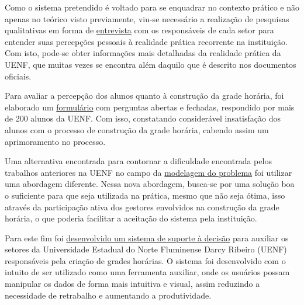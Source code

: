 
Como o sistema pretendido é voltado para se enquadrar no contexto prático e não apenas no teórico visto previamente, viu-se necessário a realização de pesquisas qualitativas em forma de \hyperref[sec:entrevistas]{entrevista} com os responsáveis de cada setor para entender suas percepções pessoais à realidade prática recorrente na instituição. Com isto, pode-se obter informações mais detalhadas da realidade prática da UENF, que muitas vezes se encontra além daquilo que é descrito nos documentos oficiais.


Para avaliar a percepção dos alunos quanto à construção da grade horária, foi elaborado um \hyperref[sec:formulario]{formulário} com perguntas abertas e fechadas, respondido por mais de 200 alunos da UENF. Com isso, constatando considerável insatisfação dos alunos com o processo de construção da grade horária, cabendo assim um aprimoramento no processo.


Uma alternativa encontrada para contornar a dificuldade encontrada pelos trabalhos anteriores na UENF no campo da \hyperref[chap:modelagem]{modelagem do problema} foi utilizar uma abordagem diferente. Nessa nova abordagem, busca-se por uma solução boa o suficiente para que seja utilizada na prática, mesmo que não seja ótima, isso através da participação ativa dos gestores envolvidos na construção da grade horária, o que poderia facilitar a aceitação do sistema pela instituição.


Para este fim foi \hyperref[chap:desenvolvimento]{desenvolvido um sistema de suporte à decisão} para auxiliar os setores da Universidade Estadual do Norte Fluminense Darcy Ribeiro (UENF) responsáveis pela criação de grades horárias. O sistema foi desenvolvido com o intuito de ser utilizado como uma ferramenta auxiliar, onde os usuários possam manipular os dados de forma mais intuitiva e visual, assim reduzindo a necessidade de retrabalho e aumentando a produtividade.

